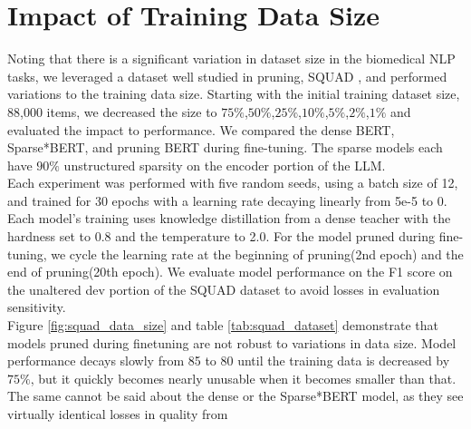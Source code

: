 \documentclass[10pt]{article}
\begin{document}
\section{Impact of Training Data Size}
Noting that there is a significant variation in dataset size in the biomedical NLP tasks, we leveraged a dataset well studied in pruning, SQUAD \cite{Rajpurkar2016SQuAD1Q}, and performed variations to the training data size. Starting with the initial training dataset size, 88,000 items, we decreased the size to $75\%$,$50\%$,$25\%$,$10\%$,$5\%$,$2\%$,$1\%$ and evaluated the impact to performance. We compared the dense BERT, Sparse*BERT, and pruning BERT during fine-tuning. The sparse models each have $90\%$ unstructured sparsity on the encoder portion of the LLM. \\ 
Each experiment was performed with five random seeds, using a batch size of 12, and trained for 30 epochs with a learning rate decaying linearly from 5e-5 to 0. Each model's training uses knowledge distillation from a dense teacher with the hardness set to 0.8 and the temperature to 2.0. For the model pruned during fine-tuning, we cycle the learning rate at the beginning of pruning(2nd epoch) and the end of pruning(20th epoch). We evaluate model performance on the F1 score on the unaltered dev portion of the SQUAD dataset to avoid losses in evaluation sensitivity.\\
Figure \ref{fig:squad_data_size} and table \ref{tab:squad_dataset} demonstrate that models pruned during finetuning are not robust to variations in data size. Model performance decays slowly from 85 to 80 until the training data is decreased by $75\%$, but it quickly becomes nearly unusable when it becomes smaller than that. The same cannot be said about the dense or the Sparse*BERT model, as they see virtually identical losses in quality from 
\end{document}
